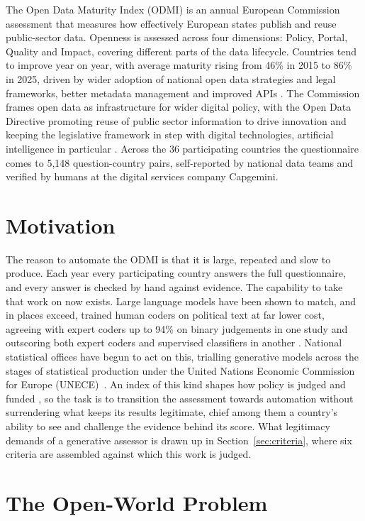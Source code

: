 The Open Data Maturity Index (ODMI) is an annual European Commission assessment that measures how effectively European states publish and reuse public-sector data. Openness is assessed across four dimensions: Policy, Portal, Quality and Impact, covering different parts of the data lifecycle. Countries tend to improve year on year, with average maturity rising from 46\% in 2015 to 86\% in 2025, driven by wider adoption of national open data strategies and legal frameworks, better metadata management and improved APIs \citep{edp2025}. The Commission frames open data as infrastructure for wider digital policy, with the Open Data Directive promoting reuse of public sector information to drive innovation and keeping the legislative framework in step with digital technologies, artificial intelligence in particular \citep{edp2025}. Across the 36 participating countries the questionnaire comes to 5,148 question-country pairs, self-reported by national data teams and verified by humans at the digital services company Capgemini.


\section{Motivation}\label{sec:motivation}

The reason to automate the ODMI is that it is large, repeated and slow to produce. Each year every participating country answers the full questionnaire, and every answer is checked by hand against evidence. The capability to take that work on now exists. Large language models have been shown to match, and in places exceed, trained human coders on political text at far lower cost, agreeing with expert coders up to 94\% on binary judgements in one study and outscoring both expert coders and supervised classifiers in another \citep{heseltine2024,tornberg2025}. National statistical offices have begun to act on this, trialling generative models across the stages of statistical production under the United Nations Economic Commission for Europe (UNECE)~\citep{unece2025}. An index of this kind shapes how policy is judged and funded \citep{davis2012}, so the task is to transition the assessment towards automation without surrendering what keeps its results legitimate, chief among them a country's ability to see and challenge the evidence behind its score. What legitimacy demands of a generative assessor is drawn up in Section~\ref{sec:criteria}, where six criteria are assembled against which this work is judged.


\section{The Open-World Problem}\label{sec:open-world}

